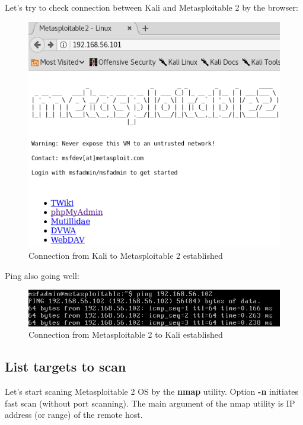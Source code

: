 \documentclass[14pt,a4paper,report]{report}
\begin{document}
\clearpage

Let's try to check connection between Kali and Metasploitable 2 by the browser:

\begin{figure}[h!]
	\centering
	\includegraphics[scale = 0.60]{images/2.png}
	\caption{Connection from Kali to Metasploitable 2 established}
\end{figure}

Ping also going well:

\begin{figure}[h!]
	\centering
	\includegraphics[scale = 0.68]{images/3.png}
	\caption{Connection from Metasploitable 2 to Kali established}
\end{figure}

\subsection{List targets to scan}

Let's start scaning Metasploitable 2 OS by the \textbf{nmap} utility. Option \textbf{-n} initiates fast scan (without port scanning). The main argument of the nmap utility is IP address (or range) of the remote host.
\end{document}
